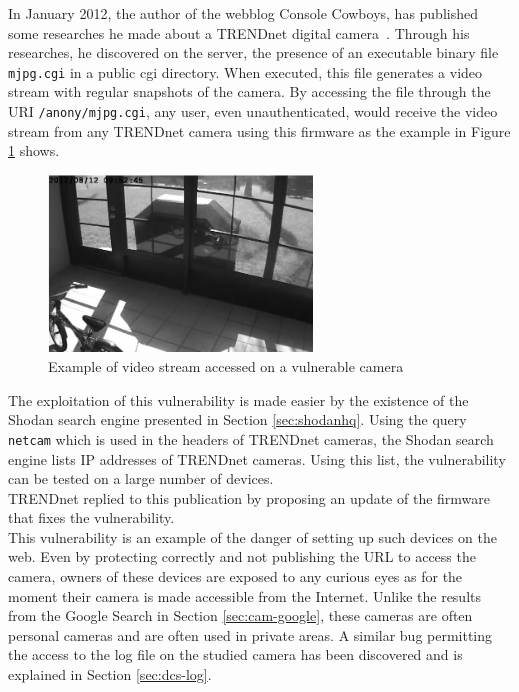 In January 2012, the author of the webblog Console Cowboys, has published some researches he made about a TRENDnet digital camera~\cite{trendnet-hack}.
Through his researches, he discovered on the server, the presence of an executable binary file \texttt{mjpg.cgi} in a public cgi directory.
When executed, this file generates a video stream with regular snapshots of the camera.
By accessing the file through the URI \texttt{/anony/mjpg.cgi}, any user, even unauthenticated, would receive the video stream from any TRENDnet camera using this firmware as the example in Figure \ref{fig:trendnet-hack} shows.\\

\begin{figure}[h]
  \centering
  \includegraphics[width=7cm]{images/trendnet-hack2.png}
  \caption{Example of video stream accessed on a vulnerable camera}
  \label{fig:trendnet-hack}
\end{figure}

The exploitation of this vulnerability is made easier by the existence of the Shodan search engine presented in Section \ref{sec:shodanhq}.
Using the query \texttt{netcam} which is used in the headers of TRENDnet cameras, the Shodan search engine lists IP addresses of TRENDnet cameras.
Using this list, the vulnerability can be tested on a large number of devices.\\

TRENDnet replied to this publication by proposing an update of the firmware that fixes the vulnerability.
\\

This vulnerability is an example of the danger of setting up such devices on the web.
Even by protecting correctly and not publishing the URL to access the camera, owners of these devices are exposed to any curious eyes as for the moment their camera is made accessible from the Internet.
Unlike the results from the Google Search in Section \ref{sec:cam-google}, these cameras are often personal cameras and are often used in private areas.
A similar bug permitting the access to the log file on the studied camera has been discovered and is explained in Section \ref{sec:dcs-log}.